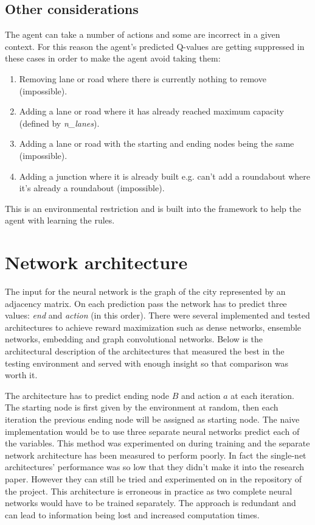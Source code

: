 \documentclass[
]{elteikthesis}[2023/04/10]
\begin{document}
\subsection{Other considerations}

The agent can take a number of actions and some are incorrect in a
given context. For this reason the agent's predicted Q-values are getting 
suppressed in these cases in order to make the agent avoid taking them:
\begin{enumerate}
\item Removing lane or road where there is currently nothing to remove (impossible).
\item Adding a lane or road where it has already reached maximum capacity
(defined by \emph{n\_lanes}).
\item Adding a lane or road with the starting and ending nodes being the
same (impossible).
\item Adding a junction where it is already built e.g. can't add a roundabout
where it's already a roundabout (impossible).
\end{enumerate}
This is an environmental restriction and is built into the framework
to help the agent with learning the rules.

\section{Network architecture}

The input for the neural network is the graph of the city represented
by an adjacency matrix. On each prediction pass the network has to
predict three values: \emph{end} and \emph{action} (in this order).
There were several implemented and tested architectures to achieve
reward maximization such as dense networks, ensemble networks, embedding
and graph convolutional networks. Below is the architectural description
of the architectures that measured the best in the testing environment
and served with enough insight so that comparison was worth it. 

The architecture has to predict ending node $B$ and action $a$ at
each iteration. The starting node is first given by the environment
at random, then each iteration the previous ending node will be assigned
as starting node. The naive implementation would be to use three separate
neural networks predict each of the variables. This method was experimented
on during training and the separate network architecture has been
measured to perform poorly. In fact the single-net architectures'
performance was so low that they didn't make it into the research
paper. However they can still be tried and experimented on in the
repository of the project. This architecture is erroneous in practice
as two complete neural networks would have to be trained separately.
The approach is redundant and can lead to information being lost and
increased computation times. 
\end{document}
